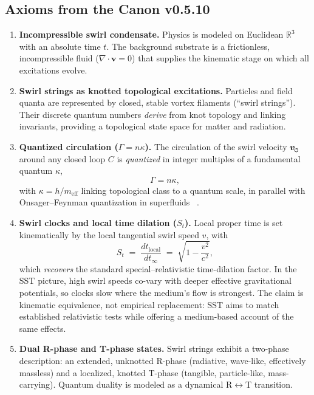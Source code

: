 \documentclass[10pt,reprint,aps,onecolumn,nofootinbib]{revtex4-2}
\newcommand{\vect}[1]{\boldsymbol{#1}} %
\newcommand{\vv}{\vect{v}}
\begin{document}
    \subsection*{Axioms from the Canon v0.5.10}
        \begin{enumerate}
        \item \textbf{Incompressible swirl condensate.} Physics is modeled on Euclidean $\mathbb{R}^3$ with an absolute time $t$. The background substrate is a frictionless, incompressible fluid ($\nabla \cdot \vv=0$) that supplies the kinematic stage on which all excitations evolve.

        \item \textbf{Swirl strings as knotted topological excitations.} Particles and field quanta are represented by closed, stable vortex filaments (``swirl strings''). Their discrete quantum numbers \emph{derive} from knot topology and linking invariants, providing a topological state space for matter and radiation.

        \item \textbf{Quantized circulation ($\Gamma=n\kappa$).} The circulation of the swirl velocity $\vect{v}_{\mkern-2mu\scriptscriptstyle\boldsymbol{\circlearrowleft}}$ around any closed loop $C$ is \emph{quantized} in integer multiples of a fundamental quantum $\kappa$,
        \[
            \Gamma = n\kappa,
        \]
        with $\kappa=h/m_{\mathrm{eff}}$ linking topological class to a quantum scale, in parallel with Onsager–Feynman quantization in superfluids~ \cite{Onsager1949}.

        \item \textbf{Swirl clocks and local time dilation ($S_t$).} Local proper time is set kinematically by the local tangential swirl speed $v$, with
        \begin{equation}
        S_t \;=\; \frac{dt_\text{local}}{dt_\infty} \;=\; \sqrt{1-\frac{v^2}{c^2}},
        \label{eq:swirlclock}
        \end{equation}
        which \emph{recovers} the standard special–relativistic time-dilation factor. In the SST picture, high swirl speeds co-vary with deeper effective gravitational potentials, so clocks slow where the medium’s flow is strongest. The claim is kinematic equivalence, not empirical replacement: SST aims to match established relativistic tests while offering a medium-based account of the same effects.

        \item \textbf{Dual R-phase and T-phase states.} Swirl strings exhibit a two-phase description: an extended, unknotted R-phase (radiative, wave-like, effectively massless) and a localized, knotted T-phase (tangible, particle-like, mass-carrying). Quantum duality is modeled as a dynamical R$\leftrightarrow$T transition.


\end{enumerate}
\end{document}
